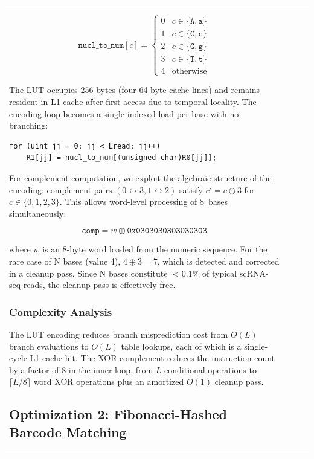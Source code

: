 \documentclass[11pt,twocolumn]{article}
\begin{document}
\begin{table}[t]
\begin{tabular}{@{}lrrr@{}}
\begin{equation}
\texttt{nucl\_to\_num}[c] = \begin{cases}
0 & c \in \{\texttt{A}, \texttt{a}\} \\
1 & c \in \{\texttt{C}, \texttt{c}\} \\
2 & c \in \{\texttt{G}, \texttt{g}\} \\
3 & c \in \{\texttt{T}, \texttt{t}\} \\
4 & \text{otherwise}
\end{cases}
\label{eq:lut}
\end{equation}

The LUT occupies 256 bytes (four 64-byte cache lines) and remains resident in L1 cache after first access due to temporal locality. The encoding loop becomes a single indexed load per base with no branching:

\begin{lstlisting}
for (uint jj = 0; jj < Lread; jj++)
    R1[jj] = nucl_to_num[(unsigned char)R0[jj]];
\end{lstlisting}

For complement computation, we exploit the algebraic structure of the encoding: complement pairs $(0 \leftrightarrow 3, 1 \leftrightarrow 2)$ satisfy $c' = c \oplus 3$ for $c \in \{0,1,2,3\}$. This allows word-level processing of 8~bases simultaneously:

\begin{equation}
\texttt{comp} = w \oplus \texttt{0x0303030303030303}
\label{eq:xor}
\end{equation}

where $w$ is an 8-byte word loaded from the numeric sequence. For the rare case of N bases (value 4), $4 \oplus 3 = 7$, which is detected and corrected in a cleanup pass. Since N bases constitute $<$0.1\% of typical scRNA-seq reads, the cleanup pass is effectively free.

\subsubsection{Complexity Analysis}

The LUT encoding reduces branch misprediction cost from $O(L)$ branch evaluations to $O(L)$ table lookups, each of which is a single-cycle L1 cache hit. The XOR complement reduces the instruction count by a factor of 8 in the inner loop, from $L$ conditional operations to $\lceil L/8 \rceil$ word XOR operations plus an amortized $O(1)$ cleanup pass.

\subsection{Optimization 2: Fibonacci-Hashed Barcode Matching}
\label{sec:hash}


\end{tabular}
\end{table}
\end{document}

